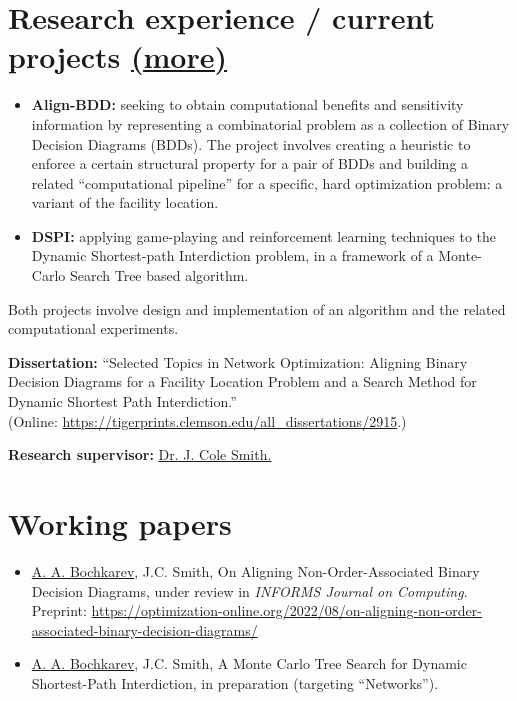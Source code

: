 \documentclass[11pt]{article} \usepackage{geometry} %
\newcommand{\mhref}[1]{\hfill\href{#1}{\small (more\faExternalLink*)}}
\begin{document}
  \section*{Research experience / current projects \mhref{https://www.bochkarev.io/research/}}
  \begin{itemize}
    \itemsep0pt
  \item \textbf{Align-BDD:} seeking to obtain computational benefits and
    sensitivity information by representing a combinatorial problem as a
    collection of Binary Decision Diagrams (BDDs). The project involves creating a heuristic to enforce a
    certain structural property for a pair of BDDs and building a related
    ``computational pipeline'' for a specific, hard optimization problem: a
    variant of the facility location. 
  \item \textbf{DSPI:} applying game-playing and reinforcement
    learning techniques to the Dynamic Shortest-path Interdiction problem,
    in a framework of a Monte-Carlo Search Tree based algorithm.
  \end{itemize} 
  Both projects involve design and implementation of an algorithm and
  the related computational experiments.\vspace{0.5em}

  \noindent\textbf{Dissertation:} ``Selected Topics in Network Optimization:
  Aligning Binary Decision Diagrams for a Facility Location Problem and a Search
  Method for Dynamic Shortest Path Interdiction.''\\
  \noindent (Online: \href{https://tigerprints.clemson.edu/all_dissertations/2915}{https://tigerprints.clemson.edu/all\_dissertations/2915}.)
  \vspace{0.5em}

  \noindent\textbf{Research supervisor:}
  \href{https://scholar.google.com/citations?user=87CaUHYAAAAJ&hl=en}{Dr. J. Cole
    Smith.}
  \vspace{1.5em}

 \section*{Working papers}
 \begin{itemize}
    \itemsep0pt
    \item \underline{A. A. Bochkarev}, J.C. Smith, On Aligning
    Non-Order-Associated Binary Decision Diagrams, under review in
    \textit{INFORMS Journal on Computing}. Preprint: \href{https://optimization-online.org/2022/08/on-aligning-non-order-associated-binary-decision-diagrams/}{https://optimization-online.org/2022/08/on-aligning-non-order-associated-binary-decision-diagrams/}
  \item \underline{A. A. Bochkarev}, J.C. Smith, A Monte Carlo Tree Search for
    Dynamic Shortest-Path Interdiction, in preparation (targeting ``Networks'').
 \end{itemize}
\end{document}
